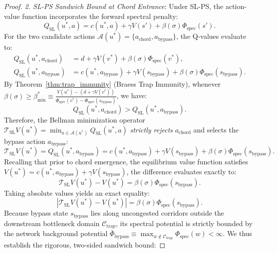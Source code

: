 \documentclass[11pt,a4paper]{article}
\begin{document}
\begin{proof}
\textit{2. SL-PS Sandwich Bound at Chord Entrance}:
Under SL-PS, the action-value function incorporates the forward spectral penalty:
\begin{equation}
Q_{\text{SL}}(u^*, a) = c(u^*, a) + \gamma V(s') + \beta(\sigma) \Phi_{\text{spec}}(s').
\end{equation}
For the two candidate actions $\mathcal{A}(u^*) = \{ a_{\text{chord}}, a_{\text{bypass}} \}$, the Q-values evaluate to:
\begin{align}
Q_{\text{SL}}(u^*, a_{\text{chord}}) &= d + \gamma V(v^*) + \beta(\sigma) \Phi_{\text{spec}}(v^*), \label{eq:q_chord_eval} \\
Q_{\text{SL}}(u^*, a_{\text{bypass}}) &= c(u^*, a_{\text{bypass}}) + \gamma V(s_{\text{bypass}}) + \beta(\sigma) \Phi_{\text{spec}}(s_{\text{bypass}}). \label{eq:q_bypass_eval}
\end{align}
By Theorem~\ref{thm:trap_immunity} (Braess Trap Immunity), whenever $\beta(\sigma) \ge \beta_{\min}^* \equiv \frac{V(u^*) - (d + \gamma V(v^*))}{\Phi_{\text{spec}}(v^*) - \Phi_{\text{spec}}(s_{\text{bypass}})}$, we have:
\begin{equation}
Q_{\text{SL}}(u^*, a_{\text{chord}}) > Q_{\text{SL}}(u^*, a_{\text{bypass}}).
\end{equation}
Therefore, the Bellman minimization operator $\mathcal{T}_{\text{SL}} V(u^*) = \min_{a \in \mathcal{A}(u^*)} Q_{\text{SL}}(u^*, a)$ \textit{strictly rejects} $a_{\text{chord}}$ and selects the bypass action $a_{\text{bypass}}$:
\begin{equation}
\mathcal{T}_{\text{SL}} V(u^*) = Q_{\text{SL}}(u^*, a_{\text{bypass}}) = c(u^*, a_{\text{bypass}}) + \gamma V(s_{\text{bypass}}) + \beta(\sigma) \Phi_{\text{spec}}(s_{\text{bypass}}).
\end{equation}
Recalling that prior to chord emergence, the equilibrium value function satisfies $V(u^*) = c(u^*, a_{\text{bypass}}) + \gamma V(s_{\text{bypass}})$, the difference evaluates exactly to:
\begin{equation}
\label{eq:tsl_minus_v_exact}
\mathcal{T}_{\text{SL}} V(u^*) - V(u^*) = \beta(\sigma) \Phi_{\text{spec}}(s_{\text{bypass}}).
\end{equation}
Taking absolute values yields an exact equality:
\begin{equation}
|\mathcal{T}_{\text{SL}} V(u^*) - V(u^*)| = \beta(\sigma) \Phi_{\text{spec}}(s_{\text{bypass}}).
\end{equation}
Because bypass state $s_{\text{bypass}}$ lies along uncongested corridors outside the downstream bottleneck domain $\mathcal{C}_{\text{trap}}$, its spectral potential is strictly bounded by the network background potential $\bar{\Phi}_{\text{bypass}} \equiv \max_{w \notin \mathcal{C}_{\text{trap}}} \Phi_{\text{spec}}(w) < \infty$. We thus establish the rigorous, two-sided sandwich bound:

\end{proof}
\end{document}
